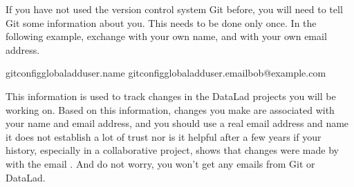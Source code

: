 \sphinxAtStartPar
If you have not used the version control system Git before, you will need to
tell Git some information about you. This needs to be done only once.
In the following example, exchange  with your own name, and
 with your own email address.

\begin{sphinxVerbatim}[commandchars=\\\{\}]
\PYGZti{}
gitconfig\PYGZhy{}\PYGZhy{}global\PYGZhy{}\PYGZhy{}adduser.name
gitconfig\PYGZhy{}\PYGZhy{}global\PYGZhy{}\PYGZhy{}adduser.emailbob@example.com
\end{sphinxVerbatim}

\sphinxAtStartPar
This information is used to track changes in the DataLad projects you will
be working on. Based on this information, changes you make are associated
with your name and email address, and you should use a real email address
and name \textendash{} it does not establish a lot of trust nor is it helpful after a few
years if your history, especially in a collaborative project, shows
that changes were made by  with the email
.
And do not worry, you won’t get any emails from Git or DataLad.

\sphinxstepscope

\ignorespaces 

